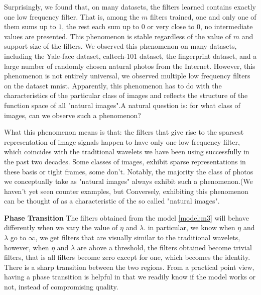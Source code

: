 \documentclass[a4paper]{article}
\begin{document}
Surprisingly, we found that, on many datasets, the filters learned contains exactly one low frequency filter. That is, among the $m$ filters trained, one and only one of them sums up to $1$, the rest each sum up to $0$ or very close to $0$, no intermediate values are presented. This phenomenon is stable regardless of the value of $m$ and support size of the filters. We observed this phenomenon on many datasets, including the Yale-face dataset, caltech-101 dataset, the fingerprint dataset, and a large number of randomly chosen natural photos from the Internet. However, this phenomenon is not entirely universal, we observed multiple low frequency filters on the dataset mnist. Apparently, this phenomenon has to do with the characteristics of the particular class of images and reflects the structure of the function space of all "natural images".A natural question is: for what class of images, can we observe such a phenomenon?

What this phenomenon means is that: the filters that give rise to the sparsest representation of image signals happen to have only one low frequency filter, which coincides with the traditional wavelets we have been using successfully in the past two decades. Some classes of images, exhibit sparse representations in these basis or tight frames, some don't. Notably, the majority the class of photos we conceptually take as "natural images" always exhibit such a phenomenon.(We haven't yet seen counter examples, but  Conversely, exhibiting this phenomenon can be thought of as a characteristic of the so called "natural images". 

\textbf{Phase Transition} The filters obtained from the model \eqref{model:m3} will behave differently when we vary the value of $\eta$ and $\lambda$. in particular, we know when $\eta$ and $\lambda$ go to $\infty$, we get filters that are visually similar to the traditional wavelets, however, when $\eta$ and $\lambda$ are above a threshold, the filters obtained become trivial filters, that is all filters become zero except for one, which becomes the identity. There is a sharp transition between the two regions. From a practical point view, having a phase transition is helpful in that we readily know if the model works or not, instead of compromising quality.
\end{document}
